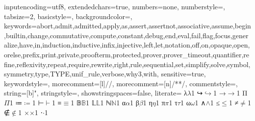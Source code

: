 
{
  inputencoding=utf8,
  extendedchars=true,
  numbers=none,
  numberstyle={},
  tabsize=2,
  basicstyle={\ttfamily\small\upshape},
  backgroundcolor=\color{lightgrey},
  keywords={abort,admit,admitted,apply,as,assert,assertnot,associative,assume,begin,builtin,change,commutative,compute,constant,debug,end,eval,fail,flag,focus,generalize,have,in,induction,inductive,infix,injective,left,let,notation,off,on,opaque,open,orelse,prefix,print,private,proofterm,protected,prover,prover_timeout,quantifier,refine,reflexivity,repeat,require,rewrite,right,rule,sequential,set,simplify,solve,symbol,symmetry,type,TYPE,unif_rule,verbose,why3,with},
  sensitive=true,
  keywordstyle=\color{blue},
  morecomment=[l]{//},
  morecomment=[n]{/*}{*/},
  commentstyle={\itshape\color{red}},
  string=[b]{"},
  stringstyle=\color{orange},
  showstringspaces=false,
  literate=
  {λ}{$\lambda$}1
  {↪}{$\hookrightarrow$}1
  {→}{$\rightarrow$}1
  {Π}{$\Pi$}1
  {≔}{$\coloneqq$}1
  {⊢}{$\vdash$}1
  {≡}{$\equiv$}1
  {𝔹}{$\mathbb{B}$}1
  {𝕃}{$\mathbb{L}$}1
  {ℕ}{$\mathbb{N}$}1
  {α}{$\alpha$}1
  {β}{$\beta$}1
  {η}{$\eta$}1
  {π}{$\pi$}1
  {τ}{$\tau$}1
  {ω}{$\omega$}1
  {∧}{$\wedge$}1
  {≤}{$\le$}1
  {≠}{$\neq$}1
  {∉}{$\notin$}1
  {×}{$\times$}1
  {⋅}{$\cdot$}1
}
